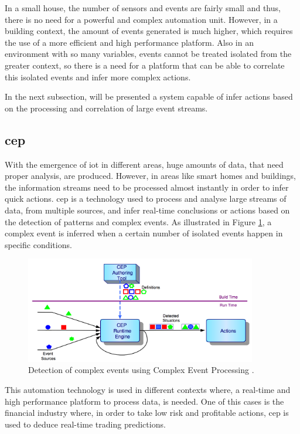 In a small house, the number of sensors and events are fairly small and thus, there is no need for a powerful and complex automation unit. However, in a building context, the amount of events generated is much higher, which requires the use of a more efficient and high performance platform. Also in an environment with so many variables, events cannot be treated isolated from the greater context, so there is a need for a platform that can be able to correlate this isolated events and infer more complex actions.

In the next subsection, will be presented a system capable of infer actions based on the processing and correlation of large event streams.

\subsection{\acf{cep}}

With the emergence of \ac{iot} in different areas, huge amounts of data, that need proper analysis, are produced. However, in areas like smart homes and buildings, the information streams need to be processed almost instantly in order to infer quick actions. \acf{cep} is a technology used to process and analyse large streams of data, from multiple sources, and infer real-time conclusions or actions based on the detection of patterns and complex events. As illustrated in Figure \ref{fig:cep}, a complex event is inferred when a certain number of isolated events happen in specific conditions.  


\begin{figure}[H]
	\centering
	\includegraphics[width=0.9\textwidth]{figures/cep1.png}
	\caption{Detection of complex events using Complex Event Processing \cite{Pooja2015}.}
	\label{fig:cep}
\end{figure}

This automation technology is used in different contexts where, a real-time and high performance platform to process data, is needed. One of this cases is the financial industry where, in order to take low risk and profitable actions, \ac{cep} is used to deduce real-time trading predictions.


